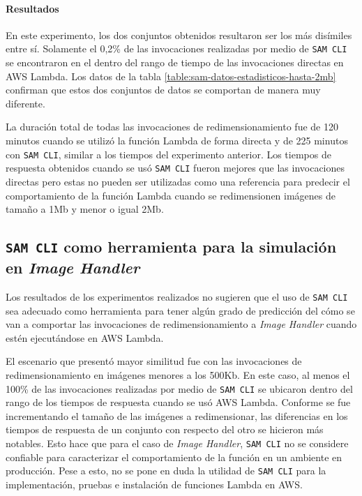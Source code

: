 \paragraph{Resultados} En este experimento, los dos conjuntos obtenidos resultaron ser los más disímiles entre sí. Solamente el 0,2\% de las invocaciones realizadas por medio de \texttt{SAM CLI} se encontraron en el dentro del rango de tiempo de las invocaciones directas en AWS Lambda. Los datos de la tabla \ref{table:sam-datos-estadisticos-hasta-2mb} confirman que estos dos conjuntos de datos se comportan de manera muy diferente. 

La duración total de todas las invocaciones de redimensionamiento fue de 120 minutos cuando se utilizó la función Lambda de forma directa y de 225 minutos con \texttt{SAM CLI}, similar a los tiempos del experimento anterior. Los tiempos de respuesta obtenidos cuando se usó \texttt{SAM CLI} fueron mejores que las invocaciones directas pero estas no pueden ser utilizadas como una referencia para predecir el comportamiento de la función Lambda cuando se redimensionen imágenes de tamaño a 1Mb y menor o igual 2Mb.

\subsection{\texttt{SAM CLI} como herramienta para la simulación en \emph{Image Handler}}
Los resultados de los experimentos realizados no sugieren que el uso de \texttt{SAM CLI} sea adecuado como herramienta para tener algún grado de predicción del cómo se van a comportar las invocaciones de redimensionamiento a \emph{Image Handler} cuando estén ejecutándose en AWS Lambda.

El escenario que presentó mayor similitud fue con las invocaciones de redimensionamiento en imágenes menores a los 500Kb. En este caso, al menos el 100\% de las invocaciones realizadas por medio de \texttt{SAM CLI} se ubicaron dentro del rango de los tiempos de respuesta cuando se usó AWS Lambda. Conforme se fue incrementando el tamaño de las imágenes a redimensionar, las diferencias en los tiempos de respuesta de un conjunto con respecto del otro se hicieron más notables. Esto hace que para el caso de \emph{Image Handler}, \texttt{SAM CLI} no se considere confiable para caracterizar el comportamiento de la función en un ambiente en producción. Pese a esto, no se pone en duda la utilidad de \texttt{SAM CLI} para la implementación, pruebas e instalación de funciones Lambda en AWS.

